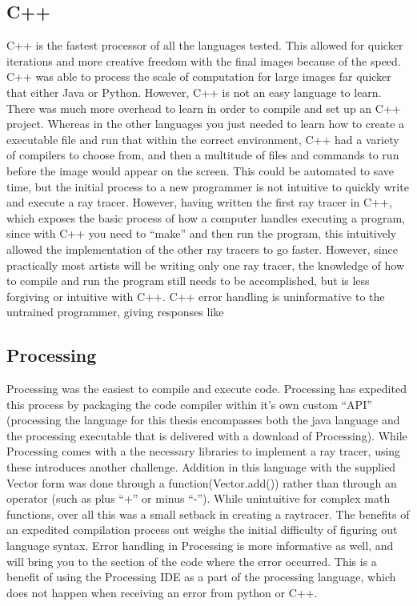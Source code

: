 \subsection{C++}
C++ is the fastest processor of all the languages tested.  This allowed for quicker iterations and more creative freedom with the final images because of the speed.  C++ was able to process the scale of computation for large images far quicker that either Java or Python.  However, C++ is not an easy language to learn.  There was much more overhead to learn in order to compile and set up an C++ project.  Whereas in the other languages you just needed to learn how to create a executable file and run that within the correct environment, C++ had a variety of compilers to choose from, and then a multitude of files and commands to run before the image would appear on the screen.  This could be automated to save time, but the initial process to a new programmer is not intuitive to quickly write and execute a ray tracer.  However, having written the first ray tracer in C++, which exposes the basic process of how a computer handles executing a program, since with C++ you need to ``make'' and then run the program, this intuitively allowed the implementation of the other ray tracers to go faster.  However, since practically most artists will be writing only one ray tracer, the knowledge of how to compile and run the program still needs to be accomplished, but is less forgiving or intuitive with C++.  C++ error handling is uninformative to the untrained programmer, giving responses like %

\subsection{Processing}
Processing was the easiest to compile and execute code.  Processing has expedited this process by packaging the code compiler within it's own custom ``API'' (processing the language for this thesis encompasses both the java language and the processing executable that is delivered with a download of Processing).  While Processing comes with a the necessary libraries to implement a ray tracer, using these introduces another challenge.  Addition in this language with the supplied Vector form was done through a function(Vector.add()) rather than through an operator (such as plus ``+'' or minus ``-'').  While unintuitive for complex math functions, over all this was a small setback in creating a raytracer.  The benefits of an expedited compilation process out weighs the initial difficulty of figuring out language syntax.  Error handling in Processing is more informative as well, and will bring you to the section of the code where the error occurred.  This is a benefit of using the Processing IDE as a part of the processing language, which does not happen when receiving an error from python or C++.

